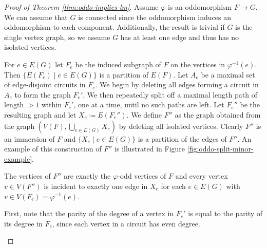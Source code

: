 \documentclass[11pt]{article}
\begin{document}
\begin{proof}[Proof of Theorem \ref{thm:oddo-implies-lm}]
    Assume $\varphi$ is an oddomorphism $F \to G$. 
    We can assume that $G$ is connected since the oddomorphism induces an oddomorphism to each component. Additionally, the result is trivial if $G$ is the single vertex graph, so we assume $G$ has at least one edge and thus has no isolated vertices.
    \par 
    For $e \in E(G)$ let $F_e$ be the induced subgraph of $F$ on the vertices in $\varphi^{-1}(e)$. Then $\{E(F_e) \mid e \in E(G)\}$ is a partition of $E(F)$.
    Let $A_e$ be a maximal set of edge-disjoint circuits in $F_e$. We begin by deleting all edges forming a circuit in $A_e$ to form the graph $F_e'$. We then repeatedly split off a maximal length path of length $>1$ within $F_e'$, one at a time, until no such paths are left. Let $F_e''$ be the resulting graph and let $X_e \coloneqq E(F_e'')$.
    We define $F''$ as the graph obtained from the graph $(V(F), \bigcup_{e \in E(G)} X_e)$ by deleting all isolated vertices. Clearly $F''$ is an immersion of $F$ and $\{X_e \mid e \in E(G)\}$ is a partition of the edges of $F''$.
    An example of this construction of $F''$ is illustrated in Figure \ref{fig:oddo-split-minor-example}.
    \begin{claim}
        The vertices of $F''$ are exactly the $\varphi$-odd vertices of $F$ and every vertex $v \in V(F'')$ is incident to exactly one edge in $X_e$ for each $e \in E(G)$ with $v \in V(F_e) = \varphi^{-1}(e)$.
    \end{claim}
    \begin{proofofclaim}
        First, note that the parity of the degree of a vertex in $F_e'$ is equal to the parity of its degree in $F_e$, since each vertex in a circuit has even degree.

\end{proofofclaim}
\end{proof}
\end{document}
